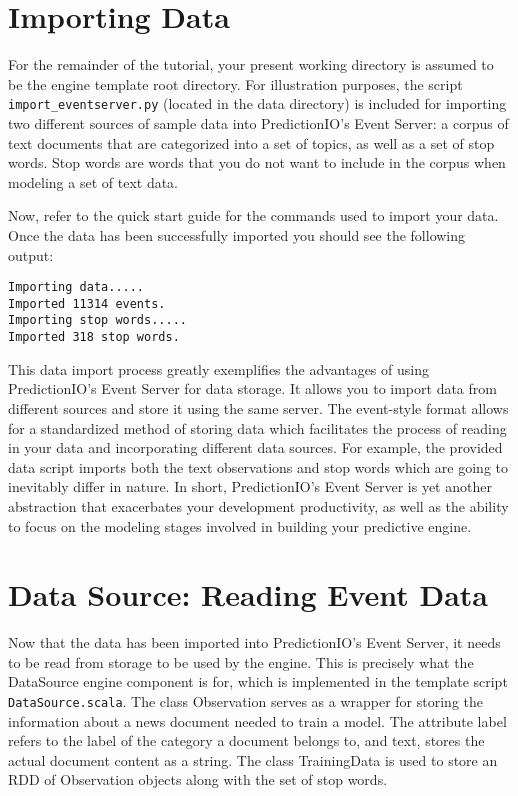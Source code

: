 \documentclass[a4paper,12pt]{article}
\renewcommand{\tt}[1]{\texttt{#1}}
\newcommand{\3}{\left}
\newcommand{\4}{\right}
\renewcommand{\-}[1]{{}^{-#1}}
\begin{document}
\section*{Importing Data}

For the remainder of the tutorial, your present working directory is assumed to be the engine template root directory. For illustration purposes, the script \tt{import\_eventserver.py} (located in the data directory) is included for importing two different sources of sample data into PredictionIO's Event Server: a corpus of text documents
that are categorized into a set of topics, as well as a set of stop words. Stop words are words that you do not want to include in the corpus when modeling a set of text data. 

Now, refer to the quick start guide for the commands used to import your data. Once the data has been successfully imported you should see the following output:
\vspace{-0.5cm}
\begin{verbatim}
Importing data.....
Imported 11314 events.
Importing stop words.....
Imported 318 stop words.
 \end{verbatim}
 This data import process greatly exemplifies the advantages of using PredictionIO's Event Server for data storage. It allows you to import data from different sources and store it using the same server. The event-style format
 allows for a standardized method of storing data which facilitates the process of reading in your data and incorporating different data sources. For example, the provided data script imports both the text observations and stop words which are going to inevitably differ in nature. In short, PredictionIO's Event Server is yet another abstraction that exacerbates your development productivity, as well as the ability to focus on the modeling stages involved in building your predictive engine.
 

\section*{Data Source: Reading Event Data}

Now that the data has been imported into PredictionIO's Event Server, it needs to be read from storage to be used by the engine. This is precisely what the DataSource engine component is for, which is implemented in the template script \tt{DataSource.scala}. The class Observation serves as a wrapper for storing the information about a news document needed to train a model. The attribute label refers to the label of the category a document belongs to, and text, stores the actual document content as a string. The class TrainingData is used to store an RDD of Observation objects along with the set of stop words. 
\end{document}
